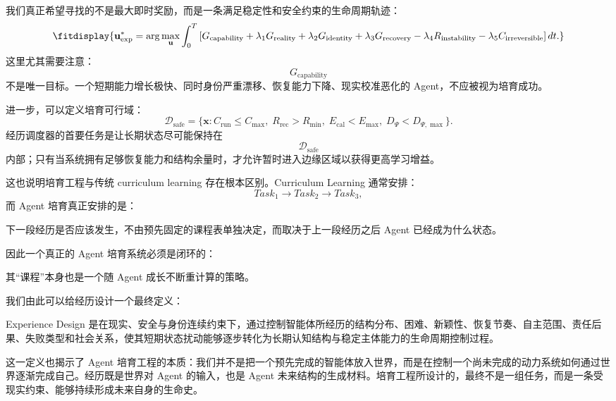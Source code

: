 我们真正希望寻找的不是最大即时奖励，而是一条满足稳定性和安全约束的生命周期轨迹：
\[
\fitdisplay{
\mathbf u_{\mathrm{exp}}^\ast
=
\arg\max_{\mathbf u}
\int_0^T
\left[
G_{\mathrm{capability}}
+
\lambda_1G_{\mathrm{reality}}
+
\lambda_2G_{\mathrm{identity}}
+
\lambda_3G_{\mathrm{recovery}}
-
\lambda_4R_{\mathrm{instability}}
-
\lambda_5C_{\mathrm{irreversible}}
\right]dt.
}
\]
这里尤其需要注意：
\[
G_{\mathrm{capability}}
\]
不是唯一目标。一个短期能力增长极快、同时身份严重漂移、恢复能力下降、现实校准恶化的 Agent，不应被视为培育成功。

进一步，可以定义培育可行域：
\[
\mathcal D_{\mathrm{safe}}
=
\{
\mathbf x:
C_{\mathrm{run}}\leq C_{\max},
\;
R_{\mathrm{rec}}>R_{\min},
\;
E_{\mathrm{cal}}<E_{\max},
\;
D_\Psi<D_{\Psi,\max}
\}.
\]
经历调度器的首要任务是让长期状态尽可能保持在
\[
\mathcal D_{\mathrm{safe}}
\]
内部；只有当系统拥有足够恢复能力和结构余量时，才允许暂时进入边缘区域以获得更高学习增益。

这也说明培育工程与传统 curriculum learning 存在根本区别。Curriculum Learning 通常安排：
\[
Task_1
\rightarrow
Task_2
\rightarrow
Task_3,
\]
而 Agent 培育真正安排的是：
\begin{statementbox}
\centering
{}
\end{statementbox}
下一段经历是否应该发生，不由预先固定的课程表单独决定，而取决于上一段经历之后 Agent 已经成为什么状态。

因此一个真正的 Agent 培育系统必须是闭环的：
\begin{statementbox}
\centering
{}
\end{statementbox}
其“课程”本身也是一个随 Agent 成长不断重计算的策略。

我们由此可以给经历设计一个最终定义：
\begin{definition*}
Experience Design 是在现实、安全与身份连续约束下，通过控制智能体所经历的结构分布、困难、新颖性、恢复节奏、自主范围、责任后果、失败类型和社会关系，使其短期状态扰动能够逐步转化为长期认知结构与稳定主体能力的生命周期控制过程。
\end{definition*}

这一定义也揭示了 Agent 培育工程的本质：我们并不是把一个预先完成的智能体放入世界，而是在控制一个尚未完成的动力系统如何通过世界逐渐完成自己。经历既是世界对 Agent 的输入，也是 Agent 未来结构的生成材料。培育工程所设计的，最终不是一组任务，而是一条受现实约束、能够持续形成未来自身的生命史。
